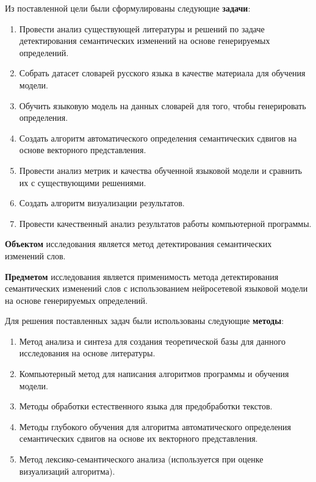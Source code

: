 \documentclass[LI,VKR]{HSEUniversity}
\begin{document}
Из поставленной цели были сформулированы следующие \textbf{задачи}:
\begin{enumerate}
    \item Провести анализ существующей литературы и решений по задаче детектирования семантических
    изменений на основе генерируемых определений.
    \item Собрать датасет словарей русского языка в качестве материала для обучения модели.
    \item Обучить языковую модель на данных словарей для того, чтобы генерировать определения.
    \item Создать алгоритм автоматического определения семантических сдвигов на
основе векторного представления.
    \item Провести анализ метрик и качества обученной языковой модели и сравнить их с
    существующими решениями.
    \item Создать алгоритм визуализации результатов.
    \item Провести качественный анализ результатов работы компьютерной программы.
\end{enumerate}

\textbf{Объектом} исследования является метод детектирования семантических изменений слов.

\textbf{Предметом} исследования является применимость метода детектирования семантических изменений
слов с использованием нейросетевой языковой модели на основе генерируемых определений.

Для решения поставленных задач были использованы следующие \textbf{методы}:
\begin{enumerate}
    \item Метод анализа и синтеза для создания теоретической базы для данного исследования
на основе литературы.
    \item Компьютерный метод для написания алгоритмов программы и обучения модели.
    \item Методы обработки естественного языка для предобработки текстов.
    \item Методы глубокого обучения для алгоритма автоматического определения семантических
сдвигов на основе их векторного представления.
    \item Метод лексико-семантического анализа (используется при оценке визуализаций алгоритма).
\end{enumerate}
\end{document}
